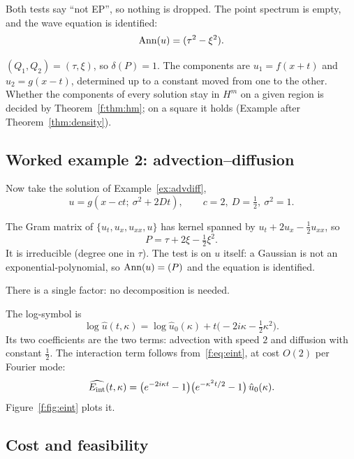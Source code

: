 \begin{example}
Both tests say ``not EP'', so nothing is dropped. The point spectrum is empty, and the wave equation is identified:
\[
\operatorname{Ann}(u)=(\tau^2-\xi^2).
\]
\end{example}

\begin{example}
$(Q_1,Q_2)=(\tau,\xi)$, so $\delta(P)=1$. The components are $u_1=f(x+t)$ and $u_2=g(x-t)$, determined up to a constant moved from one to the other. Whether the components of every solution stay in $H^m$ on a given region is decided by Theorem~\ref{f:thm:hm}; on a square it holds (Example after Theorem~\ref{thm:density}).
\end{example}

\subsection{Worked example 2: advection--diffusion}

Now take the solution of Example~\ref{ex:advdiff},
\[
u=g(x-ct;\ \sigma^2+2Dt),\qquad c=2,\ D=\tfrac12,\ \sigma^2=1 .
\]

\begin{example}[{Steps 1--4}]
The Gram matrix of $\{u_t,u_x,u_{xx},u\}$ has kernel spanned by $u_t+2u_x-\tfrac12u_{xx}$, so
\[
P=\tau+2\xi-\tfrac12\xi^2 .
\]
It is irreducible (degree one in $\tau$). The test is on $u$ itself: a Gaussian is not an exponential-polynomial, so $\operatorname{Ann}(u)=(P)$ and the equation is identified.
\end{example}

\begin{example}[{Step 5}]
There is a single factor: no decomposition is needed.
\end{example}

\begin{example}
The log-symbol is
\[
\log\hat u(t,\kappa)=\log\hat u_0(\kappa)+t\big(-2i\kappa-\tfrac12\kappa^2\big).
\]
Its two coefficients are the two terms: advection with speed $2$ and diffusion with constant $\tfrac12$. The interaction term follows from~\eqref{f:eq:eint}, at cost $O(2)$ per Fourier mode:
\[
\widehat{E_{\mathrm{int}}}(t,\kappa)=\big(e^{-2i\kappa t}-1\big)\big(e^{-\kappa^2t/2}-1\big)\,\hat u_0(\kappa).
\]
Figure~\ref{f:fig:eint} plots it.
\end{example}

\subsection{Cost and feasibility}

